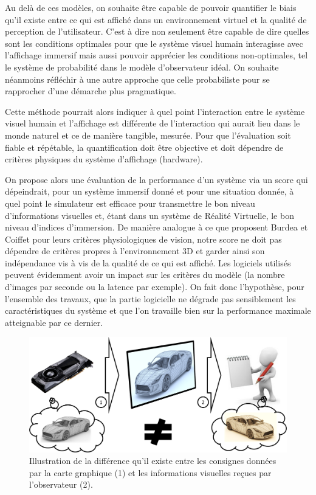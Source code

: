 	\par Au delà de ces modèles, on souhaite être capable de pouvoir quantifier le biais qu'il existe entre ce qui est affiché dans un environnement virtuel et la qualité de perception de l'utilisateur. C'est à dire non seulement être capable de dire quelles sont les conditions optimales pour que le système visuel humain interagisse avec l'affichage immersif mais aussi pouvoir apprécier les conditions non-optimales, tel le système de probabilité dans le modèle d'observateur idéal. On souhaite néanmoins réfléchir à une autre approche que celle probabiliste pour se rapprocher d'une démarche plus pragmatique.
	
	\par Cette méthode pourrait alors indiquer à quel point l'interaction entre le système visuel humain et l'affichage est différente de l'interaction qui aurait lieu dans le monde naturel et ce de manière tangible, mesurée. Pour que l'évaluation soit fiable et répétable, la quantification doit être objective et doit dépendre de critères physiques du système d'affichage (hardware).
	
	\par On propose alors une évaluation de la performance d'un système via un score qui dépeindrait, pour un système immersif donné et pour une situation donnée, à quel point le simulateur est efficace pour transmettre le bon niveau d'informations visuelles et, étant dans un système de Réalité Virtuelle, le bon niveau d'indices d'immersion. De manière analogue à ce que proposent Burdea et Coiffet pour leurs critères physiologiques de vision, notre score ne doit pas dépendre de critères propres à l'environnement 3D et garder ainsi son indépendance vis à vis de la qualité de ce qui est affiché. Les logiciels utilisés peuvent évidemment avoir un impact sur les critères du modèle (la nombre d'images par seconde ou la latence par exemple). On fait donc l'hypothèse, pour l'ensemble des travaux, que la partie logicielle ne dégrade pas sensiblement les caractéristiques du système et que l'on travaille bien sur la performance maximale atteignable par ce dernier.
	
	\begin{figure}
		\centering
		\includegraphics[scale=.45]{Figures/ImageBias}
		\caption{Illustration de la différence qu'il existe entre les consignes données par la carte graphique (1) et les informations visuelles reçues par l'observateur (2).}
		\label{fig:image_bias}
	\end{figure}
			
